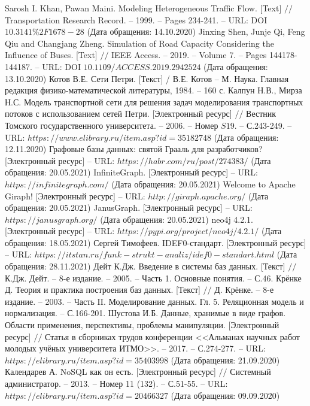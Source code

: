 \begin{thebibliography}{00}
	Sarosh I. Khan, Pawan Maini. Modeling Heterogeneous Traffic Flow. [Text] $//$ Transportation Research Record. -- 1999. -- Pages 234-241. -- URL: DOI $10.3141\%2F1678-28$ (Дата обращения: 14.10.2020)
	Jinxing Shen, Junje Qi, Feng Qiu and Changjang Zheng. Simulation of Road Capacity Considering the Influence of Buses. [Text] $//$ IEEE Access. -- 2019. -- Volume 7. -- Pages 144178-144187. -- URL: DOI $10.1109/ACCESS.2019.2942524$ (Дата обращения: 13.10.2020)
	Котов В.Е. Сети Петри. [Текст] / В.Е. Котов -- М. Наука. Главная редакция физико-математической литературы, 1984. -- 160 с.
	Калпун Н.В., Мирза Н.С. Модель транспортной сети для решения задач моделирования транспортных потоков с использованием сетей Петри. [Электронный ресурс] $//$ Вестник Томского государственного университета. -- 2006. -- Номер $S19$. -- С.243-249. -- URL: $https://www.elibrary.ru/item.asp?id=35182748$ (Дата обращения: 12.11.2020)
	Графовые базы данных: святой Грааль для разработчиков? [Электронный ресурс] -- URL: $https://habr.com/ru/post/274383/$ (Дата обращения: 20.05.2021)
	InfiniteGraph. [Электронный ресурс] -- URL: $https://infinitegraph.com/$ (Дата обращения: 20.05.2021)
	Welcome to Apache Giraph! [Электронный ресурс] -- URL: $http://giraph.apache.org/$ (Дата обращения: 20.05.2021)
	JanusGraph. [Электронный ресурс] -- URL: $https://janusgraph.org/$ (Дата обращения: 20.05.2021)
	neo4j 4.2.1. [Электронный ресурс] -- URL: $https://pypi.org/project/neo4j/4.2.1/$ (Дата обращения: 18.05.2021)
	Сергей Тимофеев. IDEF0-стандарт. [Электронный ресурс] -- URL: $https://itstan.ru/funk-strukt-analiz/idef0-standart.html$ (Дата обращения: 28.11.2021)
	Дейт К.Дж. Введение в системы баз данных. [Текст] $//$ К.Дж. Дейт. -- 8-е издание. -- 2005. -- Часть 1. Основные понятия. -- С.46.
	Крёнке Д. Теория и практика построения баз данных. [Текст] $//$ Д. Крёнке. -- 8-е издание. -- 2003. -- Часть II. Моделирование данных. Гл. 5. Реляционная модель и нормализация. -- С.166-201.
	Шустова И.Б. Данные, хранимые в виде графов. Области применения, перспективы, проблемы манипуляции. [Электронный ресурс] $//$ Статья в сборниках трудов конференции <<Альманах научных работ молодых учёных университета ИТМО>>. -- 2017. -- С.274-277. -- URL: $https://elibrary.ru/item.asp?id=35403998$ (Дата обращения: 21.09.2020)
	Календарев А. NoSQL как он есть. [Электронный ресурс] $//$ Системный администратор. -- 2013. -- Номер 11 (132). -- С.51-55. -- URL: $https://elibrary.ru/item.asp?id=20466327$ (Дата обращения: 09.09.2020)

\end{thebibliography}
